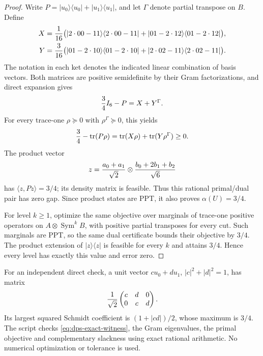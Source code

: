 \begin{proof}
Write $P=|u_0\rangle\langle u_0|+|u_1\rangle\langle u_1|$,
and let $\Gamma$ denote partial transpose on $B$. Define
\begin{align*}
 X={1\over16}\bigl(&|2\cdot00-11\rangle\langle2\cdot00-11|
       +|01-2\cdot12\rangle\langle01-2\cdot12|\bigr),\\
 Y={3\over16}\bigl(&|01-2\cdot10\rangle\langle01-2\cdot10|
       +|2\cdot02-11\rangle\langle2\cdot02-11|\bigr).
\end{align*}
The notation in each ket denotes the indicated linear combination of
basis vectors. Both matrices are positive semidefinite by their Gram
factorizations, and direct expansion gives
\begin{equation}\label{eq:dps-exact-witness}
 {3\over4}I_6-P=X+Y^\Gamma.
\end{equation}
For every trace-one $\rho\succeq0$ with $\rho^\Gamma\succeq0$, this yields
\[
 {3\over4}-\operatorname{tr}(P\rho)
 =\operatorname{tr}(X\rho)+\operatorname{tr}(Y\rho^\Gamma)\geq0.
\]
The product vector
\[
 z={a_0+a_1\over\sqrt2}\otimes{b_0+2b_1+b_2\over\sqrt6}
\]
has $\langle z,Pz\rangle=3/4$; its density matrix is feasible. Thus
this rational primal/dual pair has zero gap. Since product states
are PPT, it also proves $\alpha(U)=3/4$.

For level $k\geq1$, optimize the same objective over marginals of
trace-one positive operators on $A\otimes\operatorname{Sym}^k B$,
with positive partial transposes for every cut. Such marginals are
PPT, so the same dual certificate bounds their objective by $3/4$.
The product extension of $|z\rangle\langle z|$ is feasible for
every $k$ and attains $3/4$. Hence every level has exactly this
value and error zero.
\end{proof}

For an independent direct check, a unit vector $cu_0+du_1$,
$|c|^2+|d|^2=1$, has matrix
\[
 {1\over\sqrt2}\begin{pmatrix}c&d&0\\0&c&d\end{pmatrix}.
\]
Its largest squared Schmidt coefficient is $(1+|cd|)/2$, whose
maximum is $3/4$. The script  checks
\eqref{eq:dps-exact-witness}, the Gram eigenvalues, the primal
objective and complementary slackness using exact rational arithmetic.
No numerical optimization or tolerance is used.

